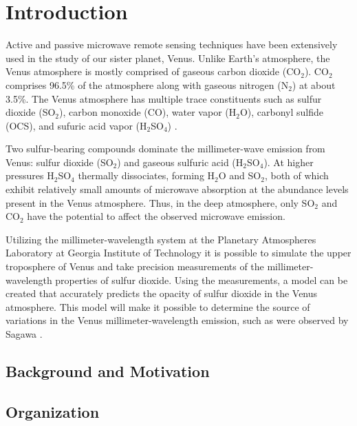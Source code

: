 \chapter{Introduction}

Active and passive microwave remote sensing techniques have been extensively used in the study of our sister planet, Venus. Unlike Earth's atmosphere, the Venus atmosphere is mostly comprised of gaseous carbon dioxide (CO$_2$). CO$_2$ comprises 96.5\% of the atmosphere along with gaseous nitrogen (N$_2$) at about 3.5\%. The Venus atmosphere has multiple trace constituents such as sulfur dioxide (SO$_2$), carbon monoxide (CO), water vapor (H$_2$O), carbonyl sulfide (OCS), and sufuric acid vapor (H$_2$SO$_4$) \cite{Suleiman-thesis}.

Two sulfur-bearing compounds dominate the millimeter-wave emission from Venus: sulfur dioxide (SO$_2$) and gaseous sulfuric acid (H$_2$SO$_4$). At higher pressures H$_2$SO$_4$ thermally dissociates, forming H$_2$O and SO$_2$, both of which exhibit relatively small amounts of microwave absorption at the abundance levels present in the Venus atmosphere. Thus, in the deep atmosphere, only SO$_2$ and CO$_2$ have the potential to affect the observed microwave emission.

Utilizing the millimeter-wavelength system at the Planetary Atmospheres Laboratory at Georgia Institute of Technology it is possible to simulate the upper troposphere of Venus and take precision measurements of the millimeter-wavelength properties of sulfur dioxide. Using the measurements, a model can be created that accurately predicts the opacity of sulfur dioxide in the Venus atmosphere. This model will make it possible to determine the source of variations in the Venus millimeter-wavelength emission, such as were observed by Sagawa \cite{observations}.

\section{Background and Motivation}

\section{Organization}
